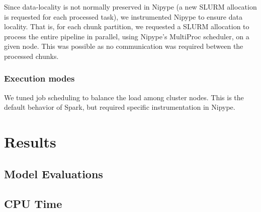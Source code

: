 \documentclass{IEEEtran}
\begin{document}
Since data-locality is not normally preserved in Nipype (a new SLURM allocation 
is requested for each processed task), we instrumented Nipype to ensure data 
locality. That is, for each chunk partition, we requested a SLURM allocation to
process the entire pipeline in parallel, using Nipype's MultiProc scheduler, on 
a given node. This was possible as no communication was required between the 
processed chunks.










\subsubsection{Execution modes} %

We tuned job scheduling to balance the load among
cluster nodes. This is the default behavior of Spark, but required
specific instrumentation in Nipype.


\section{Results} %
\label{sec:results}


\subsection{Model Evaluations}

\subsection{CPU Time}
%
\end{document}
